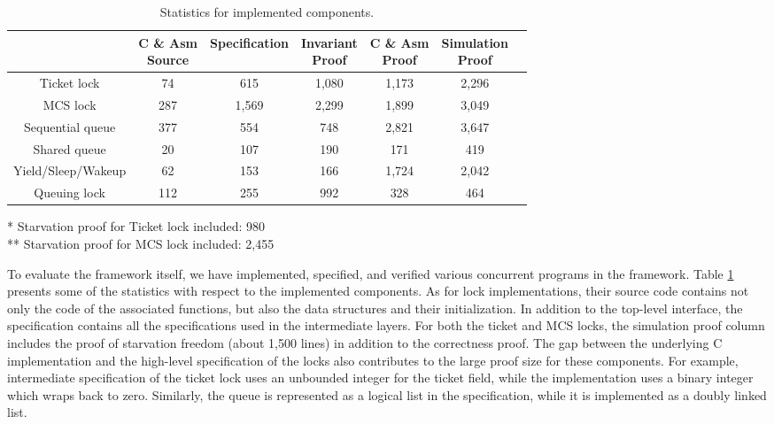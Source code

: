 \begin{table}
\begin{center}
\renewcommand{\arraystretch}{1.1}
\setlength{\tabcolsep}{0.3em}
\begin{tabular}{|c|c|c|c|c|c|c|}
\hline
 & \makecell{ C \& Asm \\Source} & Specification & \makecell{Invariant \\ Proof} & \makecell{C \& Asm \\Proof} & \makecell{Simulation \\ Proof} \\
\hline
Ticket lock & 74 & 615 & 1,080 & 1,173 & 2,296 \\
\hline
MCS lock & 287 & 1,569 & 2,299  &  1,899 & 3,049 \\
\hline
Sequential queue & 377 & 554 & 748 & 2,821& 3,647 \\
\hline
Shared queue &  20 & 107 & 190 & 171& 419\\
\hline
Yield/Sleep/Wakeup & 62 & 153 & 166 & 1,724 & 2,042 \\
\hline
Queuing lock & 112 & 255 & 992 & 328 & 464\\
\hline
\end{tabular}
\newline
\end{center}
\begin{flushright}
* Starvation proof for Ticket lock included: 980\\
** Starvation proof for MCS lock included: 2,455
\end{flushright}
\caption{Statistics for implemented components.}
\label{table:evaluation}
\hrulefill
\end{table}


To evaluate the framework itself, we have implemented, specified, and verified various
concurrent programs in the framework. Table \ref{table:evaluation} presents some of the
statistics with respect to the implemented components.
As for lock implementations,
their source code contains not only
the code of the associated functions,
but also the data structures and their initialization.
In addition to the top-level interface, the specification contains all the 
specifications used in the intermediate layers.
For both the ticket and MCS locks,
the simulation proof column
includes the proof of starvation freedom (about 1,500 lines) in addition to the correctness proof.
The gap between the underlying C implementation and the high-level specification of the locks
also contributes to the large proof size for these components.
For example, intermediate specification of the ticket lock uses an unbounded
integer for the ticket field,
while the implementation uses a binary integer
which wraps back to zero.
Similarly, the queue is represented as a logical list in the specification,
while it is implemented as a doubly linked list.

